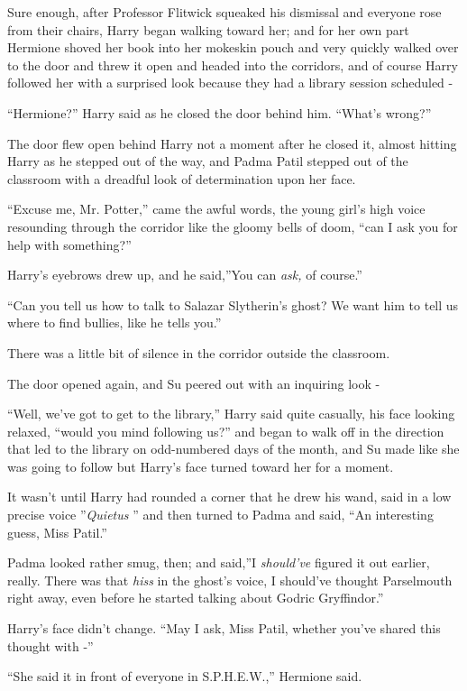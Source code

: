 Sure enough, after Professor Flitwick squeaked his dismissal and
everyone rose from their chairs, Harry began walking toward her; and for
her own part Hermione shoved her book into her mokeskin pouch and very
quickly walked over to the door and threw it open and headed into the
corridors, and of course Harry followed her with a surprised look
because they had a library session scheduled -

``Hermione?'' Harry said as he closed the door behind him. ``What's
wrong?''

The door flew open behind Harry not a moment after he closed it, almost
hitting Harry as he stepped out of the way, and Padma Patil stepped out
of the classroom with a dreadful look of determination upon her face.

``Excuse me, Mr. Potter,'' came the awful words, the young girl's high
voice resounding through the corridor like the gloomy bells of doom,
``can I ask you for help with something?''

Harry's eyebrows drew up, and he said,''You can \emph{ask,} of course.''

``Can you tell us how to talk to Salazar Slytherin's ghost? We want him
to tell us where to find bullies, like he tells you.''

There was a little bit of silence in the corridor outside the classroom.

The door opened again, and Su peered out with an inquiring look -

``Well, we've got to get to the library,'' Harry said quite casually,
his face looking relaxed, ``would you mind following us?'' and began to
walk off in the direction that led to the library on odd-numbered days
of the month, and Su made like she was going to follow but Harry's face
turned toward her for a moment.

It wasn't until Harry had rounded a corner that he drew his wand, said
in a low precise voice ''\emph{Quietus} '' and then turned to Padma and
said, ``An interesting guess, Miss Patil.''

Padma looked rather smug, then; and said,''I \emph{should've} figured it
out earlier, really. There was that \emph{hiss} in the ghost's voice, I
should've thought Parselmouth right away, even before he started talking
about Godric Gryffindor.''

Harry's face didn't change. ``May I ask, Miss Patil, whether you've
shared this thought with -''

``She said it in front of everyone in S.P.H.E.W.,'' Hermione said.

